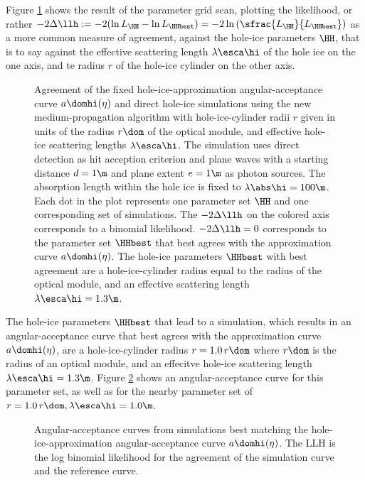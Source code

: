Figure \ref{fig:AWa5aiCh} shows the result of the parameter grid scan, plotting the likelihood, or rather $-2\Delta\llh:= -2(\ln L_\HH - \ln L_\HHbest) = -2 \ln \left(\sfrac{L_\HH}{L_\HHbest}\right)$ as a more common measure of agreement, against the hole-ice parameters $\HH$, that is to say against the effective scattering length $\lambda\esca\hi$ of the hole ice on the one axis, and te radius $r$ of the hole-ice cylinder on the other axis.

\begin{figure}[htbp]
  \caption{Agreement of the fixed hole-ice-approximation angular-acceptance curve $a\domhi(\eta)$ and direct hole-ice simulations using the new \clsim medium-propagation algorithm with hole-ice-cylinder radii $r$ given in units of the radius $r\dom$ of the optical module, and effective hole-ice scattering lengths $\lambda\esca\hi$. The simulation uses direct detection as hit acception criterion and plane waves with a starting distance $d=1\m$ and plane extent $e=1\m$ as photon sources. The absorption length within the hole ice is fixed to $\lambda\abs\hi=100\m$. Each dot in the plot represents one parameter set $\HH$ and one corresponding set of simulations. The $-2\Delta\llh$ on the colored axis corresponds to a binomial likelihood. $-2\Delta\llh = 0$ corresponds to the parameter set $\HHbest$ that best agrees with the approximation curve $a\domhi(\eta)$. The hole-ice parameters $\HHbest$ with best agreement are a hole-ice-cylinder radius equal to the radius of the optical module, and an effective scattering length $\lambda\esca\hi = 1.3\m$.}
  \label{fig:AWa5aiCh}
\end{figure}

The hole-ice parameters $\HHbest$ that lead to a simulation, which results in an angular-acceptance curve that best agrees with the approximation curve $a\domhi(\eta)$, are a hole-ice-cylinder radius $r = 1.0\,r\dom$ where $r\dom$ is the radius of an optical module, and an effecitve hole-ice scattering length $\lambda\esca\hi = 1.3\m$. Figure \ref{fig:weShir8i} shows an angular-acceptance curve for this parameter set, as well as for the nearby parameter set of $r=1.0\,r\dom, \lambda\esca\hi = 1.0\m$.

\begin{figure}[htbp]
  \hfill
  \caption{Angular-acceptance curves from simulations best matching the hole-ice-approximation angular-acceptance curve $a\domhi(\eta)$. The LLH is the log binomial likelihood for the agreement of the simulation curve and the reference curve.}
  \label{fig:weShir8i}
\end{figure}

